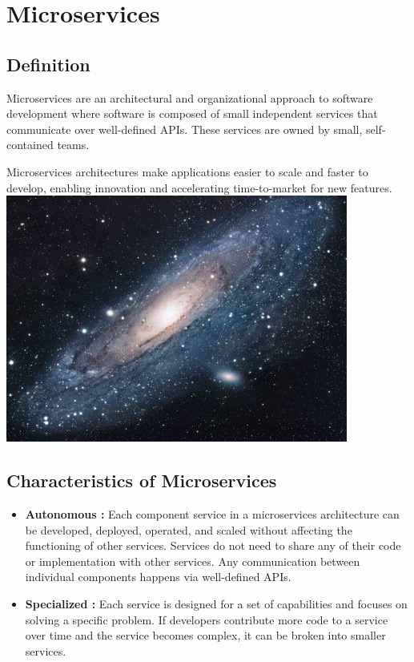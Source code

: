 \section{Microservices}
\subsection{Definition}
Microservices are an architectural and organizational approach to software development where software is composed of small independent services that communicate over well-defined APIs. These services are owned by small, self-contained teams.

\medskip
Microservices architectures make applications easier to scale and faster to develop, enabling innovation and accelerating time-to-market for new features.
\includegraphics{src/assets/images/universe.jpg}
\subsection{Characteristics of Microservices}
\begin{itemize}
	\item \textbf{Autonomous :} Each component service in a microservices architecture can be developed, deployed, operated, and scaled without affecting the functioning of other services. Services do not need to share any of their code or implementation with other services. Any communication between individual components happens via well-defined APIs.
	\item \textbf{Specialized :} Each service is designed for a set of capabilities and focuses on solving a specific problem. If developers contribute more code to a service over time and the service becomes complex, it can be broken into smaller services.
\end{itemize}

